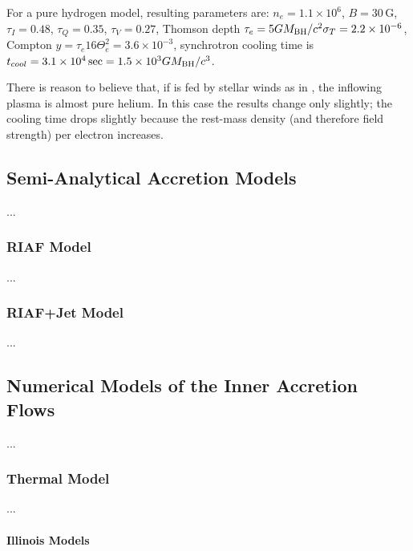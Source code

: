 \documentclass[twocolumn,twocolappendix,tighten,dvipsnames,linenumbers]{aastex63}
\begin{document}
For a pure hydrogen model, resulting parameters are: $n_e = 1.1 \times
10^6$, $B = 30\,\mathrm{G}$, $\tau_I = 0.48$, $\tau_Q = 0.35 $,
$\tau_V = 0.27$, Thomson depth $\tau_e = 5 GM_{\rm BH}/c^2 \sigma_T = 2.2
\times 10^{-6}$, Compton $y = \tau_e 16 \Theta_e^2 = 3.6 \times
10^{-3}$, synchrotron cooling time is $t_{cool} = 3.1 \times 10^4\sec
= 1.5 \times 10^3 GM_{\rm BH}/c^3$.

There is reason to believe that, if \sgra is fed by stellar winds as
in \citet{2019MNRAS.482L.123R}, the inflowing plasma is almost pure
helium.
In this case the results change only slightly; the cooling time drops
slightly because the rest-mass density (and therefore field strength)
per electron increases.

\subsection{Semi-Analytical Accretion Models}

...

\subsubsection{RIAF Model}

...

\subsubsection{RIAF+Jet Model}

...

\subsection{Numerical Models of the Inner Accretion Flows}

...

\subsubsection{Thermal Model}

...

\paragraph{Illinois Models}
\end{document}
